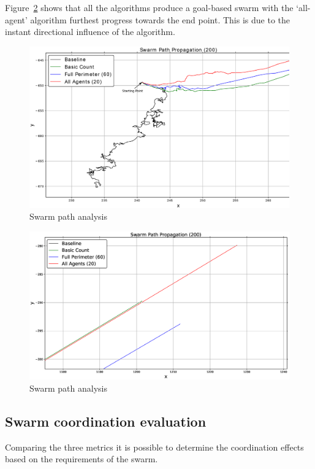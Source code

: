 Figure~\ref{fig:BaselineAllPath100-60-20-3} shows that all the algorithms produce a goal-based swarm with the `all-agent' algorithm furthest progress towards the end point. This is due to the instant directional influence of the algorithm. 

\begin{figure}[H]
\begin{center}
\includegraphics[width=14cm]{CHAPTER-6/figures/BaselineAllPath100-60-20-2}
\end{center}
\caption{Swarm path analysis\label{fig:BaselineAllPath100-60-20-2}}
\end{figure}

\begin{figure}[H]
\begin{center}
\includegraphics[width=14cm]{CHAPTER-6/figures/BaselineAllPath100-60-20-3}
\end{center}
\caption{Swarm path analysis\label{fig:BaselineAllPath100-60-20-3}}
\end{figure}

\subsection{Swarm coordination evaluation\label{reduced:coordinationEvaluation}}
Comparing the three metrics it is possible to determine the coordination effects based on the requirements of the swarm.

